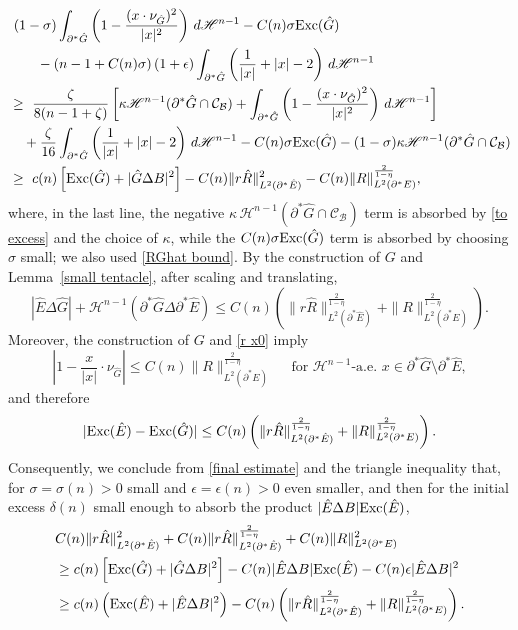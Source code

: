 \documentclass[reqno,11pt]{amsart}
\def\ez{\epsilon}
\def\sz{\sigma}
\numberwithin{equation}{section}
\theoremstyle{remark}
\begin{document}
 \begin{align*}
&\ (1-\sz)   \int_{\partial^* \hat G }   \left(1-\frac{(x\cdot \nu_{\hat G})^2}{|x|^2}\right) \, d\mathscr H^{n-1}  -C(n)\sz{\rm Exc}(\hat G) \\
&\quad \quad -\left(n-1+C(n)\sz\right)(1+\ez)\int_{\partial^* \hat G}   \left(\frac{1}{|x|}+|x|-2\right)\, d\mathscr H^{n-1}\\
  &\ge \  \frac \zeta {8(n-1+\zeta)} \left[ \kappa \mathscr H^{n-1}(\partial^* \hat G\cap \mathcal{C}_{\mathcal B})+ \int_{\partial^* \hat G }   \left(1-\frac{(x\cdot \nu_{\hat G})^2}{|x|^2}\right) \, d\mathscr H^{n-1}  \right]\\
 &\quad  + \frac{\zeta}{16}  \int_{\partial^* \hat G}   \left( \frac{1}{|x|}+|x|-2\right)\, d\mathscr H^{n-1}   -C(n)\sz{\rm Exc}(\hat G)-(1-\sz)\kappa \mathscr H^{n-1}(\partial^* \hat G\cap \mathcal{C}_{\mathcal B})\\
 &\ge   \  c(n) \left[ {\rm Exc}(\hat G) + |\hat G\Delta B|^2  \right]-C(n) \|r\hat R\|_{L^2(\partial^* \hat  E)}^{2}-C(n)\|R\|_{L^2(\partial^*E)}^{\frac{2}{1-\eta}},
\end{align*}
where, in the last line, the negative
$\kappa\,\mathscr H^{n-1}(\partial^*\hat G\cap\mathcal C_{\mathcal B})$ term
is absorbed by \eqref{to excess} and the choice of $\kappa$, while the
$C(n)\sigma{\rm Exc}(\hat G)$ term is absorbed by choosing $\sigma$ small; we
also used \eqref{RGhat bound}. 
By the construction of $G$ and Lemma~\ref{small tentacle}, after scaling and
translating,
\[
|\hat E\Delta \hat G|+\mathscr H^{n-1}(\partial^*\hat G\Delta\partial^*\hat E)
\le C(n)\left(  \|r \hat  R\|_{L^2(\partial^* \hat E)}^{\frac{2}{1-\eta}} + \|R\|_{L^2(\partial^*E)}^{\frac{2}{1-\eta}} \right).
\]
Moreover, the construction of $G$ and  \eqref{r x0} imply
$$\left|1-\frac x {|x|}\cdot \nu_{\hat G}\right|\le C(n)\|R\|_{L^2(\partial^*E)}^{\frac{2}{1-\eta}}  \quad \text{ for }  \mathscr H^{n-1}\text{-a.e. }x\in \partial^*\hat G\setminus \partial^*\hat E,$$
and therefore
$$|{\rm Exc}(\hat E)-{\rm Exc}(\hat G)|\le C(n)\left(  \|r \hat  R\|_{L^2(\partial^* \hat E)}^{\frac{2}{1-\eta}} + \|R\|_{L^2(\partial^*E)}^{\frac{2}{1-\eta}} \right). $$
Consequently, we conclude from \eqref{final estimate} and the triangle inequality that, for $\sz=\sz(n)>0$ small and $\ez=\ez(n)>0$ even smaller, and then for the initial excess $\delta(n)$ small enough to absorb the product
$|\hat E\Delta B|{\rm Exc}(\hat E)$,
\begin{align}
  & C(n) \|r \hat  R\|^2_{L^2(\partial^* \hat  E)} +C(n)  \|r \hat  R\|_{L^2(\partial^* \hat E)}^{\frac{2}{1-\eta}} + C(n)  \| R\|^2_{L^2(\partial^*E)} \nonumber \\
& \ge  c(n) \left[ {\rm Exc}(\hat G) + |\hat G\Delta B|^2   \right]  - C(n )  |\hat E\Delta B| {\rm Exc}(\hat E) -C(n)\ez |\hat E\Delta B|^2\nonumber \\
& \ge  c(n) \left(  {\rm Exc}(\hat E) +|\hat E\Delta B|^2\right) -C(n)\left(  \|r \hat  R\|_{L^2(\partial^* \hat E)}^{\frac{2}{1-\eta}} + \|R\|_{L^2(\partial^*E)}^{\frac{2}{1-\eta}} \right). \label{almost result}
\end{align}
\end{document}
